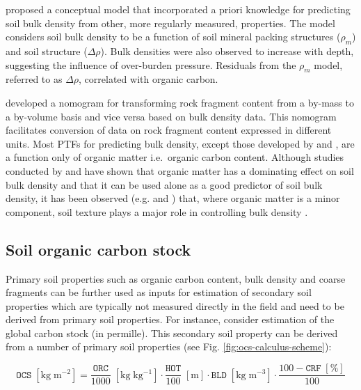 \documentclass[11pt]{krantz}
\theoremstyle{definition}
\theoremstyle{definition}
\theoremstyle{definition}
\theoremstyle{remark}
\begin{document}
\citet{Tranter2007SUM} proposed a conceptual model that incorporated a
priori knowledge for predicting soil bulk density from other, more
regularly measured, properties. The model considers soil bulk density to
be a function of soil mineral packing structures (\(\rho_m\)) and soil
structure (\(\Delta \rho\)). Bulk densities were also observed to
increase with depth, suggesting the influence of over-burden pressure.
Residuals from the \(\rho_m\) model, referred to as \(\Delta \rho\),
correlated with organic carbon.

\citet{Torri1994C} developed a nomogram for transforming rock fragment
content from a by-mass to a by-volume basis and vice versa based on bulk
density data. This nomogram facilitates conversion of data on rock
fragment content expressed in different units. Most PTFs for predicting
bulk density, except those developed by \citet{Rawls1983SS} and
\citet{Bernoux1998SSSAJ}, are a function only of organic matter
i.e.~organic carbon content. Although studies conducted by
\citet{Saini1966N} and \citet{Jeffrey1970JE} have shown that organic
matter has a dominating effect on soil bulk density and that it can be
used alone as a good predictor of soil bulk density, it has been
observed (e.g. \citet{Alexander1980SSSAJ} and \citet{Manrique1991SSSAJ})
that, where organic matter is a minor component, soil texture plays a
major role in controlling bulk density .

\hypertarget{soil-organic-carbon-stock}{%
\subsection{Soil organic carbon stock}\label{soil-organic-carbon-stock}}

Primary soil properties such as organic carbon content, bulk density and
coarse fragments can be further used as inputs for estimation of
secondary soil properties which are typically not measured directly in
the field and need to be derived from primary soil properties. For
instance, consider estimation of the global carbon stock (in permille).
This secondary soil property can be derived from a number of primary
soil properties \citep{Nelson1982, sanderman2018soil} (see Fig.
\ref{fig:ocs-calculus-scheme}):

\begin{equation}
    \mathtt{OCS} \; [\mathrm{kg \; m^{-2}}] = \frac{{\mathtt{ORC}}}{{1000}} \; [\mathrm{kg \; kg^{-1}}] \cdot \frac{{\mathtt{HOT}}}{{100}} \; [\mathrm{m}] \cdot \mathtt{BLD} \; [\mathrm{kg \; m^{-3}}] \cdot \frac{{100-\mathtt{CRF} \; [\mathrm{\%}]}}{{100}}
\label{eq:ocs-calc}
\end{equation}
\end{document}

